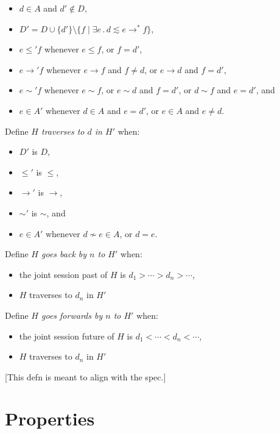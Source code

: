 \documentclass{article}
\newcommand{\aNH}{H}
\newcommand{\Docs}{D}
\newcommand{\Active}{A}
\newcommand{\parentOf}{\rightarrow}
\newcommand{\leChron}{\le}
\newcommand{\ltChron}{<}
\newcommand{\gtChron}{>}
\newcommand{\eqSess}{\sim}
\newcommand{\ltSess}{\lesssim}
\newcommand{\aDoc}{d}
\newcommand{\bDoc}{e}
\newcommand{\cDoc}{f}
\newcommand{\st}{\mathbin.}
\begin{document}
\begin{itemize}
\item $\aDoc\in\Active$ and $\aDoc'\notin\Docs$,
\item $\Docs' = \Docs \cup \{\aDoc'\} \setminus
  \{ \cDoc \mid \exists \bDoc \st \aDoc \ltSess \bDoc \parentOf^* \cDoc \}$,
\item $\bDoc \leChron' \cDoc$ whenever
  $\bDoc \leChron \cDoc$, or $\cDoc = \aDoc'$,
\item $\bDoc \parentOf' \cDoc$ whenever
  $\bDoc \parentOf \cDoc$ and $\cDoc \neq \aDoc$, or
  $\bDoc \parentOf \aDoc$ and $\cDoc = \aDoc'$,
\item $\bDoc \eqSess' \cDoc$ whenever
  $\bDoc \eqSess \cDoc$, or
  $\bDoc \eqSess \aDoc$ and $\cDoc = \aDoc'$, or
  $\aDoc \eqSess \cDoc$ and $\bDoc = \aDoc'$, and
\item $\bDoc \in \Active'$ whenever
  $\aDoc \in \Active$ and $\bDoc=\aDoc'$, or
  $\bDoc \in \Active$ and $\bDoc\ne\aDoc$.
\end{itemize}
Define \emph{$\aNH$ traverses to $\aDoc$ in $\aNH'$} when:
\begin{itemize}
\item $\Docs'$ is $\Docs$,
\item $\leChron'$ is $\leChron$,
\item $\parentOf'$ is $\parentOf$,
\item $\eqSess'$ is $\eqSess$, and
\item $\bDoc\in\Active'$ whenever $\aDoc\not\eqSess\bDoc \in \Active$, or
  $\aDoc=\bDoc$.
\end{itemize}
Define \emph{$\aNH$ goes back by $n$ to $\aNH'$} when:
\begin{itemize}
\item the joint session past of $\aNH$ is $\aDoc_1 \gtChron \cdots \gtChron \aDoc_n \gtChron \cdots$,
\item $H$ traverses to $d_n$ in $H'$
\end{itemize}
Define \emph{$\aNH$ goes forwards by $n$ to $\aNH'$} when:
\begin{itemize}
\item the joint session future of $\aNH$ is $\aDoc_1 \ltChron \cdots \ltChron \aDoc_n \ltChron \cdots$,
\item $H$ traverses to $d_n$ in $H'$
\end{itemize}
[This defn is meant to align with the spec.]
    
\section{Properties}
\end{document}
